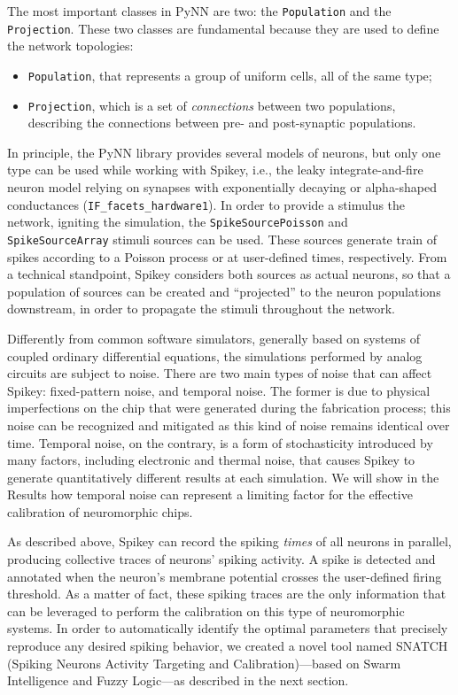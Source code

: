 \documentclass[utf8]{frontiersFPHY} %
\newcommand {\name}{SNATCH}
\begin{document}
The most important classes in PyNN are two: the \texttt{Population} and the \texttt{Projection}. 
These two classes are fundamental because they are used to define the network topologies:
\begin{itemize}
 	\item \texttt{Population}, that represents a group of uniform cells, all of the same type;
 	\item \texttt{Projection}, which is a set of \emph{connections} between two populations, describing the connections between pre- and post-synaptic populations. 
 \end{itemize} 
In principle, the PyNN library provides several models of neurons, but only one type can be used while working with Spikey, i.e., the  leaky integrate-and-fire neuron model relying on synapses with exponentially decaying or alpha-shaped conductances (\texttt{IF\_facets\_hardware1}). 
In order to provide a stimulus the network, igniting the simulation, the \texttt{SpikeSourcePoisson} and \texttt{SpikeSourceArray} stimuli sources can be used.
These sources generate train of spikes according to a Poisson process or at user-defined times, respectively.
From a technical standpoint, Spikey considers both sources as actual neurons, so that a population of sources can be created and ``projected'' to the  neuron populations downstream, in order to propagate the stimuli throughout the network.

Differently from common software simulators, generally based on systems of coupled ordinary differential equations, the simulations performed by analog circuits are subject to noise.  
There are two main types of noise that can affect Spikey: fixed-pattern noise, and temporal noise. 
The former is due to physical imperfections on the chip that were generated during the fabrication process; this noise can be recognized and mitigated as this kind of noise remains identical over time. 
Temporal noise, on the contrary, is a form of stochasticity introduced by many factors, including electronic and thermal noise, that causes Spikey to generate quantitatively different results at each simulation. 
We will show in the Results how temporal noise can represent a limiting factor for the effective calibration of neuromorphic chips.

As described above, Spikey can record the spiking \emph{times} of all neurons in parallel, producing collective traces of neurons' spiking activity.
A spike is detected and annotated when the neuron's membrane potential crosses the user-defined firing threshold. 
As a matter of fact, these spiking traces are the only information that can be leveraged to perform the calibration on this type of neuromorphic systems.
In order to automatically identify the optimal parameters that precisely reproduce any desired spiking behavior, we created a novel tool named \name{} (Spiking Neurons Activity Targeting and Calibration)---based on Swarm Intelligence and Fuzzy Logic---as described in the next section.
\end{document}

